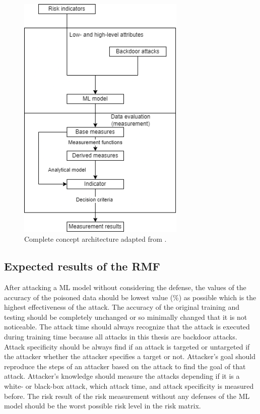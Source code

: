 \begin{figure}[ht!]
  \centering
  \includegraphics[width=8cm]{pictures/complete_architecture.png}
  \caption{Complete concept architecture adapted from \cite{ISO_27004_2009}.}
  \label{fig:complete_architecture}
\end{figure}

\subsection{Expected results of the RMF}

After attacking a ML model without considering the defense, the values of the accuracy of the poisoned data should be lowest value (\%) as possible which is the highest effectiveness of the attack. The accuracy of the original training and testing should be completely unchanged or so minimally changed that it is not noticeable. The attack time should always recognize that the attack is executed during training time because all attacks in this thesis are backdoor attacks. Attack specificity should be always find if an attack is targeted or untargeted if the attacker whether the attacker specifies a target or not. Attacker's goal should reproduce the steps of an attacker based on the attack to find the goal of that attack. Attacker's knowledge should measure the attacks depending if it is a white- or black-box attack, which attack time, and attack specificity is measured before. The risk result of the risk measurement without any defenses of the ML model should be the worst possible risk level in the risk matrix.
